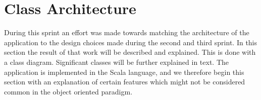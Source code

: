\section{Class Architecture}

During this sprint an effort was made towards matching the architecture of the application to the design choices made during the second and third sprint. In this section the result of that work will be described and explained. This is done with a class diagram. Significant classes will be further explained in text. The application is implemented in the Scala language, and we therefore begin this section with an explanation of certain features which might not be considered common in the object oriented paradigm.





